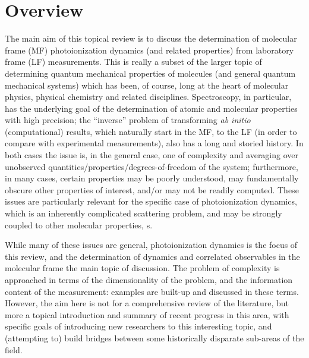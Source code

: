 \section{Overview}
The main aim of this topical review is to discuss the determination of molecular frame (MF) photoionization dynamics (and related properties) from laboratory frame (LF) measurements. This is really a subset of the larger topic of determining quantum mechanical properties of molecules (and general quantum mechanical systems) which has been, of course, long at the heart of molecular physics, physical chemistry and related disciplines. Spectroscopy, in particular, has the underlying goal of the determination of atomic and molecular properties with high precision; the “inverse” problem of transforming \textit{ab initio} (computational) results, which naturally start in the MF, to the LF (in order to compare with experimental measurements), also has a long and storied history. In both cases the issue is, in the general case, one of complexity and averaging over unobserved quantities/properties/degrees-of-freedom of the system; furthermore, in many cases, certain properties may be poorly understood, may fundamentally obscure other properties of interest, and/or may not be readily computed. These issues are particularly relevant for the specific case of photoionization dynamics, which is an inherently complicated scattering problem, and may be strongly coupled to other molecular properties, s. 

While many of these issues are general, photoionization dynamics is the focus of this review, and the determination of dynamics and correlated observables in the molecular frame the main topic of discussion. The problem of complexity is approached in terms of the dimensionality of the problem, and the information content of the measurement: examples are built-up and discussed in these terms. However, the aim here is not for a comprehensive review of the literature, but more a topical introduction and summary of recent progress in this area, with specific goals of introducing new researchers to this interesting topic, and (attempting to) build bridges between some historically disparate sub-areas of the field.